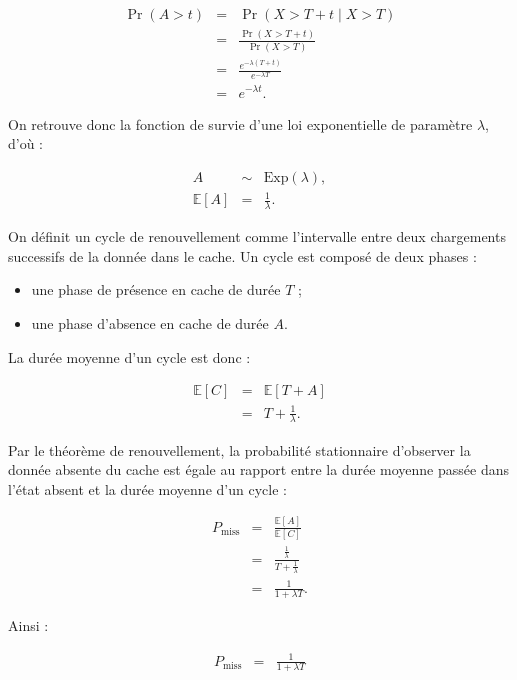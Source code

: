 \documentclass[12pt, a4paper]{report}
\begin{document}
	\begin{eqnarray}
	\Pr(A>t)
	&=&
	\Pr(X>T+t \mid X>T)\\[1ex]
	&=&
	\frac{\Pr(X>T+t)}{\Pr(X>T)}\\[1ex]
	&=&
	\frac{e^{-\lambda(T+t)}}{e^{-\lambda T}}\\[1ex]
	&=&
	e^{-\lambda t}.
	\end{eqnarray}

	\noindent On retrouve donc la fonction de survie d'une loi exponentielle de
	paramètre $\lambda$, d'où :

	\begin{eqnarray}
	A &\sim& \mathrm{Exp}(\lambda),\\
	\mathbb{E}[A] &=& \frac{1}{\lambda}.
	\end{eqnarray}

	\noindent On définit un cycle de renouvellement comme l'intervalle entre deux
	chargements successifs de la donnée dans le cache. Un cycle est composé
	de deux phases :\\

	\begin{itemize}
		\item une phase de présence en cache de durée $T$ ;
		\item une phase d'absence en cache de durée $A$.\\
	\end{itemize}

	\noindent La durée moyenne d'un cycle est donc :

	\begin{eqnarray}
	\mathbb{E}[C]
	&=&
	\mathbb{E}[T+A]\\[1ex]
	&=&
	T+\frac{1}{\lambda}.
	\end{eqnarray}

	\noindent Par le théorème de renouvellement, la probabilité stationnaire
	d'observer la donnée absente du cache est égale au rapport entre la durée
	moyenne passée dans l'état absent et la durée moyenne d'un cycle :

	\begin{eqnarray}
	P_{\mathrm{miss}}
	&=&
	\frac{\mathbb{E}[A]}{\mathbb{E}[C]}\\[1ex]
	&=&
	\frac{\frac{1}{\lambda}}
	{T+\frac{1}{\lambda}}\\[1ex]
	&=&
	\frac{1}{1+\lambda T}.
	\end{eqnarray}

	\noindent Ainsi :

	\begin{eqnarray}
	P_{\mathrm{miss}}
	&=&
	\frac{1}{1+\lambda T}
	\end{eqnarray}
\end{document}
